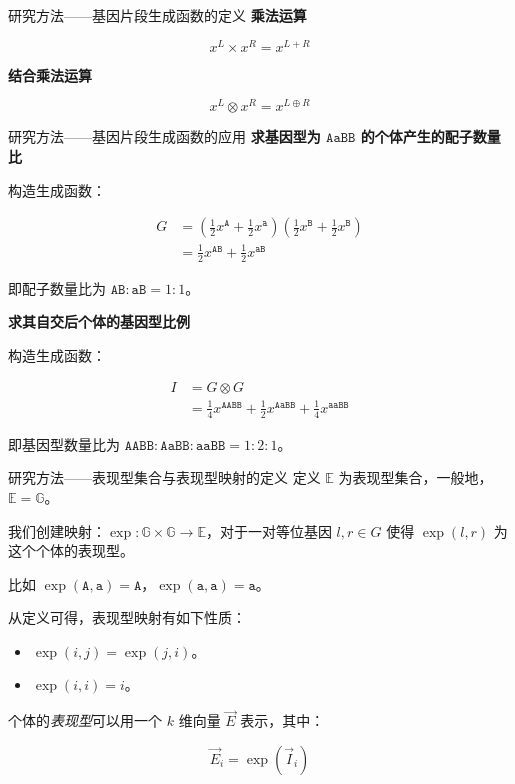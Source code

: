 \documentclass{beamer}
\begin{document}
	\begin{frame}{研究方法——基因片段生成函数的定义}
		\textbf{乘法运算}
		
		$$x^L \times x^R=x^{L+R}$$
		
		\textbf{结合乘法运算}
		
		$$x^L \otimes x^R=x^{L \oplus R}$$
	\end{frame}

	\begin{frame}{研究方法——基因片段生成函数的应用}
		\textbf{求基因型为 $\texttt{AaBB}$ 的个体产生的配子数量比}
		
		构造生成函数：
		
		$$\begin{aligned}
			G &= (\frac{1}{2} x^{\texttt{A}}+ \frac{1}{2}x^{\texttt{a}})(\frac{1}{2} x^{\texttt{B}}+ \frac{1}{2}x^{\texttt{B}}) \\
			&= \frac{1}{2} x^{\texttt{AB}} + \frac{1}{2} x^{\texttt{aB}}
		\end{aligned}$$
		
		即配子数量比为 $\texttt{AB} : \texttt{aB}=1:1$。
		
		\textbf{求其自交后个体的基因型比例}
		
		构造生成函数：
		
		$$\begin{aligned}
			I &= G \otimes G \\
			&= \frac{1}{4} x^{\texttt{AABB}} + \frac{1}{2} x^{\texttt{AaBB}} + \frac{1}{4} x^{\texttt{aaBB}}
		\end{aligned}$$
		
		即基因型数量比为 $\texttt{AABB} : \texttt{AaBB} : \texttt{aaBB}=1:2:1$。
	\end{frame}

	\begin{frame}{研究方法——表现型集合与表现型映射的定义}
		定义 $\mathbb{E}$ 为表现型集合，一般地，$\mathbb{E}=\mathbb{G}$。
		
		我们创建映射：$\operatorname{exp}:\mathbb{G} \times \mathbb{G} \to \mathbb{E}$，对于一对等位基因 $l,r \in G$ 使得 $\operatorname{exp}(l,r)$ 为这个个体的表现型。
		
		
		比如 $\operatorname{exp}(\texttt{A},\texttt{a})=\texttt{A}$，$\operatorname{exp}(\texttt{a},\texttt{a})=\texttt{a}$。
		
		从定义可得，表现型映射有如下性质：
		
		\begin{itemize}
			\item $\operatorname{exp}(i,j)=\operatorname{exp}(j,i)$。
			\item $\operatorname{exp}(i,i)=i$。
		\end{itemize}
	
		个体的\textsl{表现型}可以用一个 $k$ 维向量 $\vec E$ 表示，其中：
		
		$$\vec E_i=\operatorname{exp}(\vec I_i)$$
	\end{frame}
\end{document}
